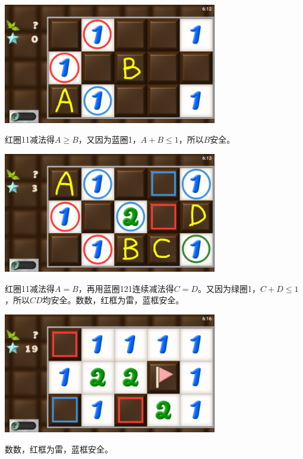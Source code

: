 \subsection{} %
\begin{center}
    \includegraphics[width=0.7\textwidth]{puzzle/104-1.png}
\end{center}
红圈11减法得$A\ge B$，又因为蓝圈1，$A+B\le 1$，所以$B$安全。
\begin{center}
    \includegraphics[width=0.7\textwidth]{puzzle/104-2.png}
\end{center}
红圈11减法得$A=B$，再用蓝圈121连续减法得$C=D$。又因为绿圈1，$C+D\le 1$，所以$CD$均安全。数数，红框为雷，蓝框安全。
\begin{center}
    \includegraphics[width=0.7\textwidth]{puzzle/104-3.png}
\end{center}
数数，红框为雷，蓝框安全。

